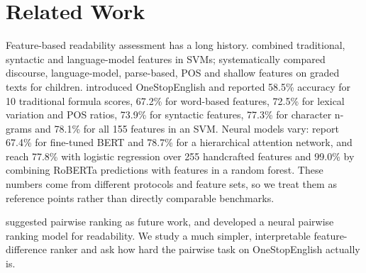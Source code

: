 \section{Related Work}

Feature-based readability assessment has a long history. \citet{schwarm2005reading} combined traditional, syntactic and language-model features in SVMs; \citet{feng2010comparison} systematically compared discourse, language-model, parse-based, POS and shallow features on graded texts for children. \citet{vajjala2018onestop} introduced OneStopEnglish and reported 58.5\% accuracy for 10 traditional formula scores, 67.2\% for word-based features, 72.5\% for lexical variation and POS ratios, 73.9\% for syntactic features, 77.3\% for character n-grams and 78.1\% for all 155 features in an SVM. Neural models vary: \citet{martinc2021supervised} report 67.4\% for fine-tuned BERT and 78.7\% for a hierarchical attention network, and \citet{lee2021pushing} reach 77.8\% with logistic regression over 255 handcrafted features and 99.0\% by combining RoBERTa predictions with features in a random forest. These numbers come from different protocols and feature sets, so we treat them as reference points rather than directly comparable benchmarks.

\citet{vajjala2018onestop} suggested pairwise ranking as future work, and \citet{lee2022neural} developed a neural pairwise ranking model for readability. We study a much simpler, interpretable feature-difference ranker and ask how hard the pairwise task on OneStopEnglish actually is.
